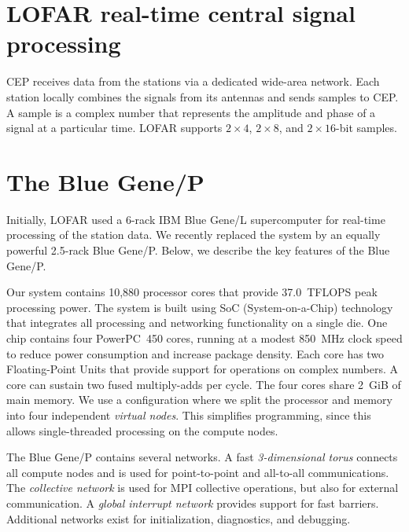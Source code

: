 \documentclass[conference]{IEEEtran}
\begin{document}
\section{LOFAR real-time central signal processing}
\label{sec:signal-processing}

CEP receives data from the stations via a dedicated wide-area network.
Each station locally combines the signals from its antennas and sends samples
to CEP.
A sample is a complex number that represents the amplitude and
phase of a signal at a particular time.
LOFAR supports $2\times4$, $2\times8$, and $2\times16$-bit samples.


\section{The Blue Gene/P}

Initially, LOFAR used a 6-rack IBM Blue Gene/L supercomputer for real-time
processing of the station data.
We recently replaced the system by an equally powerful 2.5-rack Blue Gene/P.
Below, we describe the key features of the Blue Gene/P.

Our system contains 10,880 processor cores that provide 37.0~TFLOPS peak
processing power.
The system is built using SoC (System-on-a-Chip) technology that integrates
all processing and networking functionality on a single die.
One chip contains four PowerPC~450 cores, running at a modest 850~MHz clock
speed to reduce power consumption and increase package density.
Each core has two Floating-Point Units that provide support for
operations on complex numbers.
A core can sustain two fused multiply-adds per cycle.
The four cores share 2~GiB of main memory.
We use a configuration where we split the processor and memory into four
independent \emph{virtual nodes}.  %
This simplifies programming, since this allows single-threaded processing
on the compute nodes.  %

The Blue Gene/P contains several networks.
A fast \emph{3-dimensional torus\/} connects all compute nodes and is used
for point-to-point and all-to-all communications.
The \emph{collective network\/} is used for MPI collective operations,
but also for external communication.
A \emph{global interrupt network\/} provides support for fast barriers.
Additional networks exist for initialization, diagnostics, and debugging.
\end{document}
